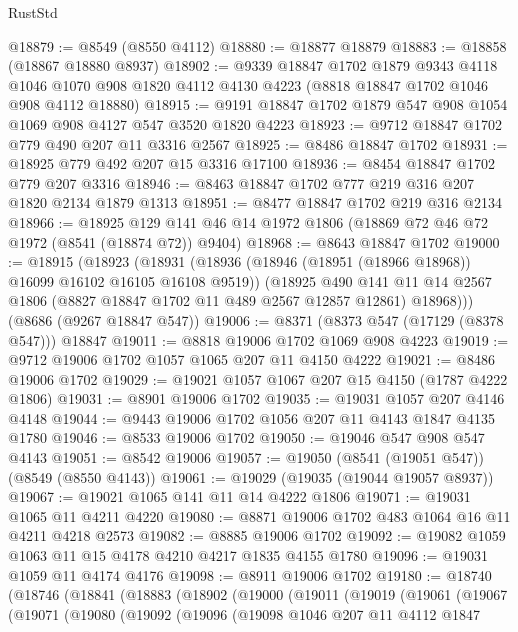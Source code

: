 \begin{lexlean}{RustStd}
\begin{coremodule}
@18879 := @8549 (@8550 @4112)
@18880 := @18877 @18879
@18883 := @18858 (@18867 @18880 @8937)
@18902 := @9339
    @18847
    @1702
    @1879
    @9343
    @4118
    @1046
    @1070
    @908
    @1820
    @4112
    @4130
    @4223
    (@8818 @18847 @1702 @1046 @908 @4112 @18880)
@18915 := @9191 @18847 @1702 @1879 @547 @908 @1054 @1069 @908 @4127 @547 @3520 @1820 @4223
@18923 := @9712 @18847 @1702 @779 @490 @207 @11 @3316 @2567
@18925 := @8486 @18847 @1702
@18931 := @18925 @779 @492 @207 @15 @3316 @17100
@18936 := @8454 @18847 @1702 @779 @207 @3316
@18946 := @8463 @18847 @1702 @777 @219 @316 @207 @1820 @2134 @1879 @1313
@18951 := @8477 @18847 @1702 @219 @316 @2134
@18966 := @18925 @129 @141 @46 @14 @1972 @1806 (@18869 @72 @46 @72 @1972 (@8541 (@18874 @72)) @9404)
@18968 := @8643 @18847 @1702
@19000 := @18915
    (@18923
      (@18931
        (@18936 (@18946 (@18951 (@18966 @18968)) @16099 @16102 @16105 @16108 @9519))
        (@18925
          @490
          @141
          @11
          @14
          @2567
          @1806
          (@8827 @18847 @1702 @11 @489 @2567 @12857 @12861)
          @18968)))
    (@8686 (@9267 @18847 @547))
@19006 := @8371 (@8373 @547 (@17129 (@8378 @547))) @18847
@19011 := @8818 @19006 @1702 @1069 @908 @4223
@19019 := @9712 @19006 @1702 @1057 @1065 @207 @11 @4150 @4222
@19021 := @8486 @19006 @1702
@19029 := @19021 @1057 @1067 @207 @15 @4150 (@1787 @4222 @1806)
@19031 := @8901 @19006 @1702
@19035 := @19031 @1057 @207 @4146 @4148
@19044 := @9443 @19006 @1702 @1056 @207 @11 @4143 @1847 @4135 @1780
@19046 := @8533 @19006 @1702
@19050 := @19046 @547 @908 @547 @4143
@19051 := @8542 @19006
@19057 := @19050 (@8541 (@19051 @547)) (@8549 (@8550 @4143))
@19061 := @19029 (@19035 (@19044 @19057 @8937))
@19067 := @19021 @1065 @141 @11 @14 @4222 @1806
@19071 := @19031 @1065 @11 @4211 @4220
@19080 := @8871 @19006 @1702 @483 @1064 @16 @11 @4211 @4218 @2573
@19082 := @8885 @19006 @1702
@19092 := @19082 @1059 @1063 @11 @15 @4178 @4210 @4217 @1835 @4155 @1780
@19096 := @19031 @1059 @11 @4174 @4176
@19098 := @8911 @19006 @1702
@19180 := @18740
    (@18746
      (@18841
        (@18883
          (@18902
            (@19000
              (@19011
                (@19019
                  (@19061
                    (@19067
                      (@19071
                        (@19080
                          (@19092
                            (@19096
                              (@19098
                                @1046
                                @207
                                @11
                                @4112
                                @1847

\end{coremodule}
\end{lexlean}

